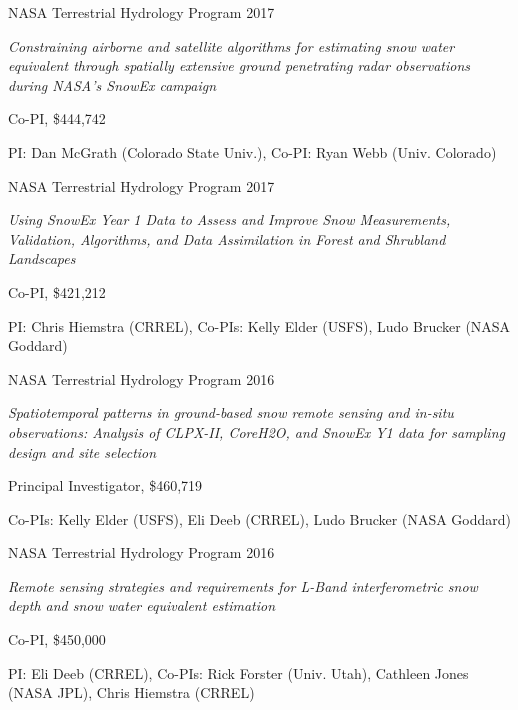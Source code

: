 \documentclass[11pt]{article}
\renewenvironment{itemize}{
  \begin{list}{}{
    \setlength{\leftmargin}{1.5em}
    \setlength{\itemsep}{0pt}
    \setlength{\parskip}{0pt}
  }
}{
  \end{list}
}
\begin{document}
\begin{itemize}
\item [6/2018-6/2021] NASA Terrestrial Hydrology Program 2017
\begin{itemize}
\item \textit{Constraining airborne and satellite algorithms for estimating snow water equivalent through spatially extensive ground penetrating radar observations during NASA's SnowEx campaign}
\item Co-PI, \$444,742
\item PI: Dan McGrath (Colorado State Univ.), Co-PI: Ryan Webb (Univ. Colorado)
\end{itemize}

\item [6/2018-6/2021] NASA Terrestrial Hydrology Program 2017
\begin{itemize}
\item \textit{Using SnowEx Year 1 Data to Assess and Improve Snow Measurements, Validation, Algorithms, and Data Assimilation in Forest and Shrubland Landscapes}
\item Co-PI, \$421,212
\item PI: Chris Hiemstra (CRREL), Co-PIs: Kelly Elder (USFS), Ludo Brucker (NASA Goddard)
\end{itemize}

\item [6/2017-6/2022] NASA Terrestrial Hydrology Program 2016
\begin{itemize}
\item \textit{Spatiotemporal patterns in ground-based snow remote sensing and in-situ observations: Analysis of CLPX-II, CoreH2O, and SnowEx Y1 data for sampling design and site selection}
\item Principal Investigator, \$460,719
\item Co-PIs: Kelly Elder (USFS), Eli Deeb (CRREL), Ludo Brucker (NASA Goddard)
\end{itemize}

\item [6/2017-6/2022] NASA Terrestrial Hydrology Program 2016
\begin{itemize}
\item \textit{Remote sensing strategies and requirements for L-Band interferometric snow depth and snow water equivalent estimation}
\item Co-PI, \$450,000
\item PI: Eli Deeb (CRREL), Co-PIs: Rick Forster (Univ. Utah), Cathleen Jones (NASA JPL), Chris Hiemstra (CRREL)
\end{itemize}


\end{itemize}
\end{document}
